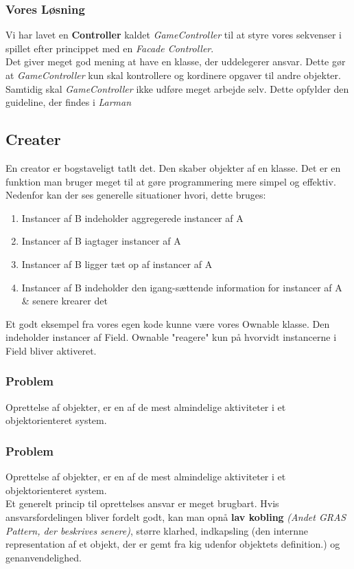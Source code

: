 \subsubsection*{Vores Løsning}
Vi har lavet en \textbf{Controller} kaldet \textit{GameController} til at styre vores sekvenser i spillet efter princippet med en \textit{Facade Controller}. 
\\
Det giver meget god mening at have en klasse, der uddelegerer ansvar. Dette gør at \textit{GameController} kun skal kontrollere og kordinere opgaver til andre objekter. Samtidig skal \textit{GameController} ikke udføre meget arbejde selv. Dette opfylder den guideline, der findes i \textit{Larman}
\subsection{Creater}
En creator er bogstaveligt tatlt det. Den skaber objekter af en klasse. Det er en funktion man bruger meget til at gøre programmering mere simpel og effektiv. Nedenfor kan der ses generelle situationer hvori, dette bruges:
\begin{enumerate}
\item Instancer af B indeholder aggregerede instancer af A
\item Instancer af B iagtager instancer af A
\item Instancer af B ligger tæt op af instancer af A
\item Instancer af B indeholder den igang-sættende information for instancer af A & senere krearer det
\end{enumerate}
Et godt eksempel fra vores egen kode kunne være vores Ownable klasse. Den indeholder instancer af Field. Ownable "reagere" kun på hvorvidt instancerne i Field bliver aktiveret. 
\subsubsection*{Problem}
Oprettelse af objekter, er en af de mest almindelige aktiviteter i et objektorienteret system.
\\
\subsubsection*{Problem}
Oprettelse af objekter, er en af de mest almindelige aktiviteter i et objektorienteret system.
\\
Et generelt princip til oprettelses ansvar er meget brugbart. Hvis ansvarsfordelingen bliver fordelt godt, kan man opnå \textbf{lav kobling} \textit{(Andet GRAS Pattern, der beskrives senere)}, større klarhed, indkapsling (den internne representation af et objekt, der er gemt fra kig udenfor objektets definition.) og genanvendelighed.
